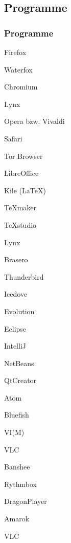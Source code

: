 \subsection{Programme}
\begin{frame}[allowframebreaks]
 \frametitle{Programme}
 
\hspace{1cm}

\begin{description}[style=nextline]

\item [ Browser] Firefox
\item Waterfox
\item  Chromium
\item  Lynx
\item  Opera bzw. Vivaldi
\item  Safari
\item  Tor Browser 
\item [Office] LibreOffice 
\item Kile (\LaTeX)
\item TeXmaker 
\item TeXstudio 
\item Lynx 
\item Brasero 
\item [Email Clients ] Thunderbird 
\item Icedove 
\item Evolution 
\item [IDEs] Eclipse 
\item IntelliJ 
\item NetBeans 
\item QtCreator 
\item Atom 
\item Bluefish 
\item VI(M)  
\item  [Musik] VLC 
\item Banshee 
\item Rythmbox 
\item DragonPlayer 
\item Amarok 
\item  [Videos] VLC 

\end{description}
\end{frame}
